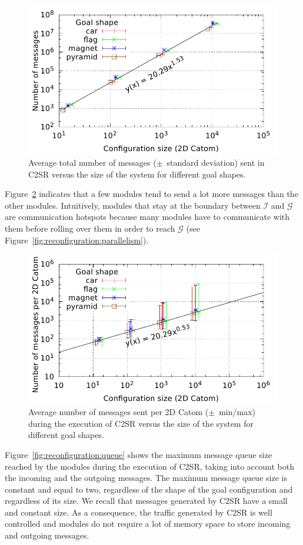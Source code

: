 \begin{figure}[!h]
	\centering
	\includegraphics[width=0.7\linewidth]{images/reconfiguration/graphs/message}
	\caption{Average total number of messages ($\pm$~standard deviation) sent in C2SR versus the size of the system for different goal shapes.}
	\label{fig:reconfiguration:message}
\end{figure}

Figure~\ref{fig:reconfiguration:message-individual} indicates that a few modules tend to send a lot more
messages than the other modules. Intuitively, modules that stay at the boundary between $\mathcal{I}$ and $\mathcal{G}$ are communication hotspots because many modules have to communicate with them before rolling over them in order to reach $\mathcal{G}$ (see Figure~\ref{fig:reconfiguration:parallelism}).

\begin{figure}[!h]
	\centering
	\includegraphics[width=0.7\linewidth]{images/reconfiguration/graphs/message-individual}
	\caption{Average number of messages sent per 2D Catom ($\pm$~min/max) during the execution of C2SR versus the size of the system for different goal shapes.}
	\label{fig:reconfiguration:message-individual}
\end{figure}

Figure~\ref{fig:reconfiguration:queue} shows the maximum message queue size reached by the modules during the execution of C2SR, taking into account both the incoming and the outgoing messages. The maximum message queue size is constant and equal to two, regardless of the shape of the goal configuration and regardless of its size. We recall that messages generated by C2SR have a small and constant size. As a consequence, the traffic generated by C2SR is well controlled and modules do not require a lot of memory space to store incoming and outgoing messages.

